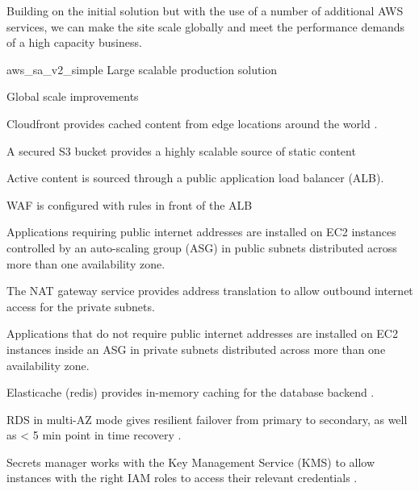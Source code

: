 
	
Building on the initial solution but with the use of a number of additional AWS services, we can make the site scale globally and meet the performance demands of a high capacity business.

\architecture
{aws_sa_v2_simple}
{Large scalable production solution}

\changes
{Global scale improvements}
{
\item \label{item:aws_sa_v2_simple_cloudfront} Cloudfront provides cached content from edge locations around the world \cite{cfn-api}. 
\item \label{item:aws_sa_v2_simple_s3_origin} A secured S3 bucket provides a highly scalable source of static content
\item \label{item:aws_sa_v2_simple_alb} Active content is sourced through a public application load balancer (ALB).
\item \label{item:aws_sa_v2_simple_waf} WAF is configured with rules in front of the ALB \cite{ AWS-shield, waf-apiref, waf-dg}
\item \label{item:aws_sa_v2_simple_azs} Applications requiring public internet addresses are installed on EC2 instances controlled by an auto-scaling group (ASG) in public subnets distributed across more than one availability zone.
\item \label{item:aws_sa_v2_simple_nat} The NAT gateway service provides address translation to allow outbound internet access for the private subnets.
\item \label{item:aws_sa_v2_simple_private} Applications that do not require public internet addresses are installed on EC2 instances inside an ASG in private subnets distributed across more than one availability zone.
\item \label{item:aws_sa_v2_simple_elasticache} Elasticache (redis) provides in-memory caching for the database backend \cite{redis-ug}.
\item \label{item:aws_sa_v2_simple_rds} RDS in multi-AZ mode gives resilient failover from primary to secondary, as well as < 5 min point in time recovery \cite{rds-api}.
\item \label{item:aws_sa_v2_simple_secrets} Secrets manager works with the Key Management Service (KMS) to allow instances with the right IAM roles to access their relevant credentials \cite{secretsmanager-userguide}.
}


